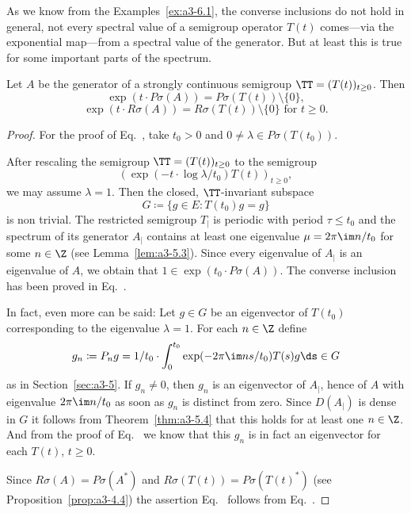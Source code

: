 As we know from the Examples~\ref{ex:a3-6.1}, the converse inclusions do not hold in general, \ie not every spectral value of a semigroup operator $T(t)$ comes---via the exponential map---from a spectral value of the generator.
But at least this is true for some important parts of the spectrum.
\begin{theorem}\label{thm:a3-6.3}%
Let $A$ be the generator of a strongly continuous semigroup $\TT = (T(t))_{t \geq 0}$.
Then
\begin{equation}\label{eq:a3-6.4}
\exp(t \cdot P\sigma(A)) = P\sigma(T(t)) \setminus \{0\} ,
\end{equation}
\begin{equation}\label{eq:a3-6.5}
\exp(t \cdot R\sigma(A)) = R\sigma(T(t)) \setminus \{0\} \text{ for } t \geq 0 .
\end{equation}
\end{theorem}
\begin{proof}
For the proof of Eq.~,  take $t_{0} > 0$ and $0 \neq \lambda \in P\sigma(T(t_{0}))$.

After rescaling the semigroup $\TT = (T(t))_{t \geq 0}$ to the semigroup
\[
(\exp(-t \cdot \log\lambda/t_{0})T(t))_{t \geq 0} ,
\]
we may assume $\lambda = 1$. 
Then the closed, $\TT$-invariant subspace
\[
G \coloneqq \{g \in E \colon T(t_{0})g = g\}
\]
is non trivial.
The restricted semigroup $T_{|}$ is periodic with period $\tau \leq t_{0}$ and the spectrum of its generator $A_{|}$ contains at least one eigenvalue $\mu = 2\pi\im n/t_{0}$ for some $n \in \Z$ (see Lemma~\ref{lem:a3-5.3}).
Since every eigenvalue of\/ $A_{|}$ is an eigenvalue of\/ $A$, we obtain that $1 \in \exp(t_{0} \cdot P\sigma(A))$.
The converse inclusion has been proved in Eq.~.

In fact, even more can be said: Let $g \in G$ be an eigenvector of\/ $T(t_{0})$ corresponding to the eigenvalue $\lambda = 1$.
For each $n \in \Z$ define
\[
g_{n} \coloneqq P_{n}g = 1/t_{0} \cdot \int_{0}^{t_{0}} \exp(-2\pi\im ns/t_{0})T(s)g  \ds \in G
\]
as in Section~\ref{sec:a3-5}.
If\/ $g_{n} \ne 0$, then $g_{n}$ is an eigenvector of\/ $A_{|}$, hence of\/ $A$ with eigenvalue $2\pi\im n/t_{0}$ as soon as $g_{n}$ is distinct from zero.
Since $D(A_{|})$ is dense in $G$ it follows from Theorem~\ref{thm:a3-5.4} that this holds for at least one $n \in \Z$.
And from the proof of Eq.~ we know that this $g_{n}$ is in fact an eigenvector for each $T(t)$, $t \geq 0$.

Since $R\sigma(A) = P\sigma(A^{*})$ and $R\sigma(T(t)) = P\sigma(T(t)^{*})$ (see Proposition~\ref{prop:a3-4.4}) the assertion Eq.~  follows from Eq.~.
\end{proof}
